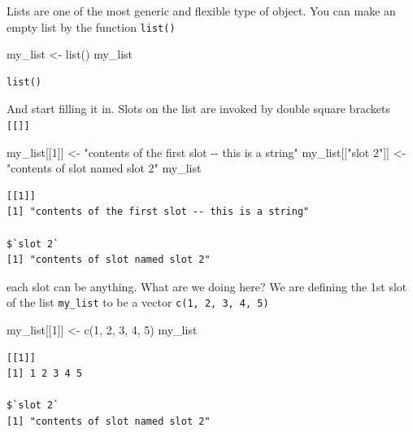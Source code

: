 \documentclass[
  letterpaper,
]{book}
\newenvironment{Shaded}{\begin{snugshade}}{\end{snugshade}}
\newcommand{\DecValTok}[1]{\textcolor[rgb]{0.68,0.00,0.00}{#1}}
\newcommand{\FunctionTok}[1]{\textcolor[rgb]{0.28,0.35,0.67}{#1}}
\newcommand{\NormalTok}[1]{\textcolor[rgb]{0.00,0.23,0.31}{#1}}
\newcommand{\OtherTok}[1]{\textcolor[rgb]{0.00,0.23,0.31}{#1}}
\newcommand{\StringTok}[1]{\textcolor[rgb]{0.13,0.47,0.30}{#1}}
\theoremstyle{definition}
\theoremstyle{definition}
\theoremstyle{plain}
\theoremstyle{definition}
\theoremstyle{plain}
\theoremstyle{plain}
\theoremstyle{remark}
\begin{document}
Lists are one of the most generic and flexible type of object. You can
make an empty list by the function \texttt{list()}

\begin{Shaded}
\begin{Highlighting}[]
\NormalTok{my\_list }\OtherTok{\textless{}{-}} \FunctionTok{list}\NormalTok{()}
\NormalTok{my\_list}
\end{Highlighting}
\end{Shaded}

\begin{verbatim}
list()
\end{verbatim}

And start filling it in. Slots on the list are invoked by double square
brackets \texttt{{[}{[}{]}{]}}

\begin{Shaded}
\begin{Highlighting}[]
\NormalTok{my\_list[[}\DecValTok{1}\NormalTok{]] }\OtherTok{\textless{}{-}} \StringTok{"contents of the first slot {-}{-} this is a string"}
\NormalTok{my\_list[[}\StringTok{"slot 2"}\NormalTok{]] }\OtherTok{\textless{}{-}} \StringTok{"contents of slot named slot 2"}
\NormalTok{my\_list}
\end{Highlighting}
\end{Shaded}

\begin{verbatim}
[[1]]
[1] "contents of the first slot -- this is a string"

$`slot 2`
[1] "contents of slot named slot 2"
\end{verbatim}

each slot can be anything. What are we doing here? We are defining the
1st slot of the list \texttt{my\_list} to be a vector
\texttt{c(1,\ 2,\ 3,\ 4,\ 5)}

\begin{Shaded}
\begin{Highlighting}[]
\NormalTok{my\_list[[}\DecValTok{1}\NormalTok{]] }\OtherTok{\textless{}{-}} \FunctionTok{c}\NormalTok{(}\DecValTok{1}\NormalTok{, }\DecValTok{2}\NormalTok{, }\DecValTok{3}\NormalTok{, }\DecValTok{4}\NormalTok{, }\DecValTok{5}\NormalTok{)}
\NormalTok{my\_list}
\end{Highlighting}
\end{Shaded}

\begin{verbatim}
[[1]]
[1] 1 2 3 4 5

$`slot 2`
[1] "contents of slot named slot 2"
\end{verbatim}
\end{document}
